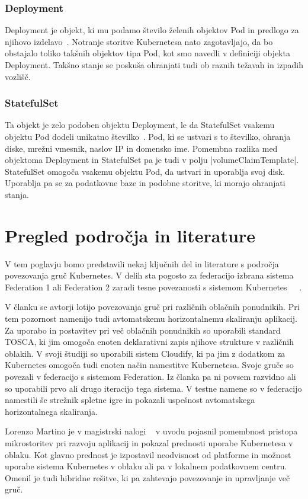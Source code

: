 \documentclass[a4paper, 12pt]{book}
\begin{document}
\subsection{Deployment}
Deployment je objekt, ki mu podamo število želenih objektov Pod in predlogo za njihovo izdelavo~\cite{deployment}.
Notranje storitve Kubernetesa nato zagotavljajo, da bo obstajalo toliko takšnih objektov tipa Pod, kot smo navedli v definiciji objekta Deployment.
Takšno stanje se poskuša ohranjati tudi ob raznih težavah in izpadih vozlišč.
\subsection{StatefulSet}
Ta objekt je zelo podoben objektu Deployment, le da StatefulSet vsakemu objektu Pod dodeli unikatno številko~\cite{statefulset}. 
Pod, ki se ustvari s to številko, ohranja diske, mrežni vmesnik, naslov IP in domensko ime.
Pomembna razlika med objektoma Deployment in StatefulSet pa je tudi v polju \spverb|volumeClaimTemplate|.
StatefulSet omogoča vsakemu objektu Pod, da ustvari in uporablja svoj disk.
Uporablja pa se za podatkovne baze in podobne storitve, ki morajo ohranjati stanja.
\chapter{Pregled področja in literature}
V tem poglavju bomo predstavili nekaj ključnih del in literature s področja povezovanja gruč Kubernetes.
V delih sta pogosto za federacijo izbrana sistema Federation 1 ali Federation 2 zaradi tesne povezanosti s sistemom Kubernetes~\cite{tosca-fed}~\cite{dyn-place}~\cite{kube-and-edge}.

V članku \cite{tosca-fed} se avtorji lotijo povezovanja gruč pri različnih oblačnih ponudnikih.
Pri tem pozornost namenijo tudi avtomatskemu horizontalnemu skaliranju aplikacij.
Za uporabo in postavitev pri več oblačnih ponudnikih so uporabili standard TOSCA, ki jim omogoča enoten deklarativni zapis njihove strukture v različnih oblakih.
V svoji študiji so uporabili sistem Cloudify, ki pa jim z dodatkom za Kubernetes omogoča tudi enoten način namestitve Kubernetesa.
Svoje gruče so povezali v federacijo s sistemom Federation. 
Iz članka pa ni povsem razvidno ali so uporabili prvo ali drugo iteracijo tega sistema.
V testne namene so v federacijo namestili še strežnik spletne igre in pokazali uspešnost avtomatskega horizontalnega skaliranja.

Lorenzo Martino je v magistrski nalogi ~\cite{dyn-place} v uvodu pojasnil pomembnost pristopa mikrostoritev pri razvoju aplikacij in pokazal prednosti uporabe Kubernetesa v oblaku.
Kot glavno prednost je izpostavil neodvisnost od platforme in možnost uporabe sistema Kubernetes v oblaku ali pa v lokalnem podatkovnem centru.
Omenil je tudi hibridne rešitve, ki pa zahtevajo povezovanje in upravljanje več gruč.
\end{document}
